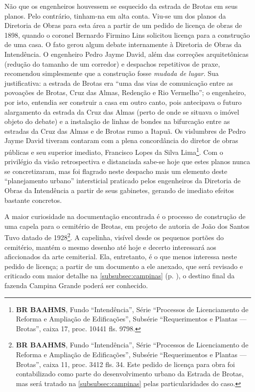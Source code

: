 Não que os engenheiros houvessem se esquecido da estrada de Brotas em seus planos. Pelo contrário, tinham-na em alta conta. Viu-se um dos planos da Diretoria de Obras para esta área a partir de um pedido de licença de obras de 1898, quando o coronel Bernardo Firmino Lins solicitou licença para a construção de uma casa. O fato gerou algum debate internamente à Diretoria de Obras da Intendência. O engenheiro Pedro Jayme David, além das correções arquitetônicas (redução do tamanho de um corredor) e despachos repetitivos de praxe, recomendou simplesmente que a construção fosse \textit{mudada de lugar}. Sua justificativa: a estrada de Brotas era ``uma das vias de comunicação entre as povoações de Brotas, Cruz das Almas, Redenção e Rio Vermelho''; o engenheiro, por isto, entendia ser construir a casa em outro canto, pois antecipava o futuro alargamento da estrada da Cruz das Almas (perto de onde se situava o imóvel objeto do debate) e a instalação de linhas de bondes na bifurcação entre as estradas da Cruz das Almas e de Brotas rumo a Itapuã. Os vislumbres de Pedro Jayme David tiveram contaram com a plena concordância do diretor de obras públicas e seu superior imediato, Francisco Lopes da Silva Lima\footnote{\textbf{BR BAAHMS}, Fundo ``Intendência'', Série ``Processos de Licenciamento de Reforma e Ampliação de Edificações'', Subsérie ``Requerimentos e Plantas --- Brotas'', caixa 17, proc. 10441 fls. 9798.}. Com o privilégio da visão retrospectiva e distanciada sabe-se hoje que estes planos nunca se concretizaram, mas foi flagrado neste despacho mais um elemento deste ``planejamento urbano'' intersticial praticado pelos engenheiros da Diretoria de Obras da Intendência a partir de seus gabinetes, gerando de imediato efeitos bastante concretos.


A maior curiosidade na documentação encontrada é o processo de construção de uma capela para o cemitério de Brotas, em projeto de autoria de João dos Santos Tuvo datado de 1928\footnote{\textbf{BR BAAHMS}, Fundo ``Intendência'', Série ``Processos de Licenciamento de Reforma e Ampliação de Edificações'', Subsérie ``Requerimentos e Plantas --- Brotas'', caixa 11, proc. 3412 fls. 34. Este pedido de licença para obra foi contabilizado como parte do desenvolvimento urbano da Estrada de Brotas, mas será tratado na \autoref{subsubsec:campinas} pelas particularidades do caso.}. A capelinha, visível desde os pequenos portões do cemitério, mantém o mesmo desenho até hoje e decerto interessará aos aficcionados da arte cemiterial. Ela, entretanto, é o que menos interessa neste pedido de licença; a partir de um documento a ele anexado, que será revisado e criticado com maior detalhe na \autoref{subsubsec:campinas} (p. \pageref{subsubsec:campinas}), o destino final da fazenda Campina Grande poderá ser conhecido.

